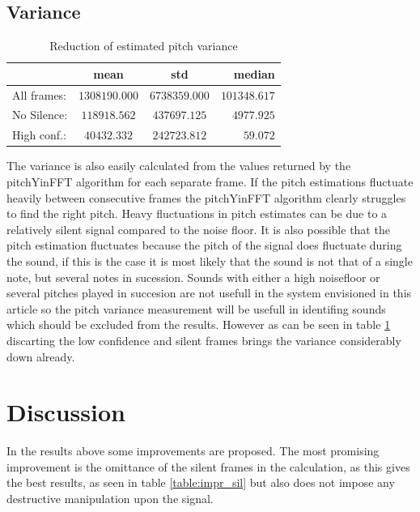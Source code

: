 \documentclass{proc}
\begin{document}
\subsection{Variance}
\begin{table}[h]
    \begin{center}
        \begin{tabular}{ | l | c | c | r |}
            \hline
                        &   mean            &   std             &   median  \\ \hline
            All frames: &   $1308190.000$   &   $6738359.000$   &   $101348.617$    \\  \hline
            No Silence: &   $118918.562$    &   $437697.125$    &   $4977.925$    \\  \hline
            High conf.: &   $40432.332$     &   $242723.812$    &   $59.072$    \\  \hline
        \end{tabular}
        \caption{Reduction of estimated pitch variance}
        \label{table:impr_var}
    \end{center}
\end{table}
The variance is also easily calculated from the values returned by the pitchYinFFT algorithm for each separate frame. If the pitch estimations fluctuate heavily between consecutive frames the pitchYinFFT algorithm clearly struggles to find the right pitch. Heavy fluctuations in pitch estimates can be due to a relatively silent signal compared to the noise floor. It is also possible that the pitch estimation fluctuates because the pitch of the signal does fluctuate during the sound, if this is the case it is most likely that the sound is not that of a single note, but several notes in sucession. Sounds with either a high noisefloor or several pitches played in succesion are not usefull in the system envisioned in this article so the pitch variance measurement will be usefull in identifing sounds which should be excluded from the results. However as can be seen in table \ref{table:impr_var} discarting the low confidence and silent frames brings the variance considerably down already. 

\section{Discussion}
In the results above some improvements are proposed. The most promising improvement is the omittance of the silent frames in the calculation, as this gives the best results, as seen in table \ref{table:impr_sil} but also does not impose any destructive manipulation upon the signal. 
\end{document}
